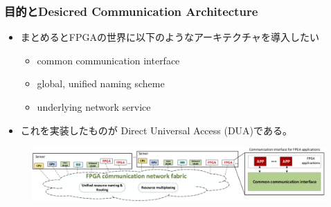 \documentclass[dvipdfmx,9pt,notheorems]{beamer}
\theoremstyle{definition}
\begin{document}
\begin{frame}\frametitle{目的とDesicred Communication Architecture}
	\begin{itemize}
		\item まとめるとFPGAの世界に以下のようなアーキテクチャを導入したい
			\begin{itemize}
				\item common communication interface
				\item global, unified naming scheme
				\item underlying network service
			\end{itemize}
		\item これを実装したものが{\color{red} Direct Universal Access (DUA)}である。
	\end{itemize}
  \begin{figure}[htb]
		\includegraphics[width=\linewidth]{fig/figure1b.png}
  \end{figure}
\end{frame}
\end{document}
